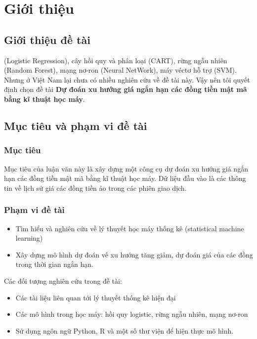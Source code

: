 \chapter{Giới thiệu} 
\section{Giới thiệu đề tài}
(Logistic Regression), cây hồi quy và phân loại (CART),
rừng ngẫu nhiên (Random Forest),
mạng nơ-ron (Neural NetWork),
máy véctơ hỗ trợ (SVM).
Nhưng ở Việt Nam lại chưa có nhiều nghiên cứu về đề tài này.
Vậy nên tôi quyết định chọn đề tài \textbf{Dự đoán xu hướng giá ngắn hạn các đồng tiền mật mã bằng kĩ thuật học máy}.
\section{Mục tiêu và phạm vi đề tài}
\subsection{Mục tiêu}
Mục tiêu của luận văn này là xây dựng một công cụ dự đoán xu hướng giá ngắn hạn
các đồng tiền mật mã bằng kĩ thuật học máy. Dữ liệu đầu vào là các thông tin về
lịch sử giá các  đồng tiền ảo trong các phiên giao dịch.
\subsection{Phạm vi đề tài}
\begin{itemize}
\item Tìm hiểu và nghiên cứu về lý thuyết học máy thống kê (statistical machine learning)
\item Xây dựng mô hình dự đoán vế xu hướng tăng giảm, dự đoán giá của các đồng trong thời gian ngắn hạn.
\end{itemize}
Các đối tượng nghiên cứu trong đề tài:
\begin{itemize}
\item Các tài liệu liên quan tới lý thuyết thống kê hiện đại
\item Các mô hình trong học máy: hồi quy logistic, rừng ngẫu nhiên, mạng nơ-ron
\item Sử dụng ngôn ngữ Python, R và một số thư viện để hiện thực mô hình.
\end{itemize}